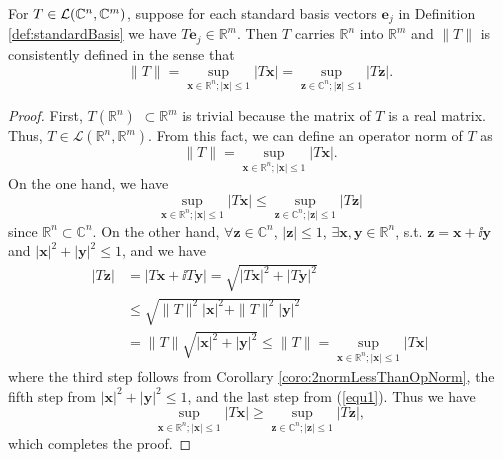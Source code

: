 \begin{lem}
  \label{lem:consistencyNestedRealInsideComplex}
  For $T\in{\cal L}(\mathbb{C}^n,\mathbb{C}^m)$, 
  suppose for each standard basis vectors $\mathbf{e}_j$
  in Definition \ref{def:standardBasis}
  we have $T \mathbf{e}_j \in \mathbb{R}^m$.
  Then $T$ carries $\mathbb{R}^n$ into $\mathbb{R}^m$
  and $\|T\|$ is consistently defined in the sense that
  \begin{equation}
    \label{eq:consistencyNestedRealInsideComplex}
    \|T\|
    = \sup_{\mathbf{x}\in \mathbb{R}^n; |\mathbf{x}|\le 1} |T \mathbf{x}|
    = \sup_{\mathbf{z}\in \mathbb{C}^n; |\mathbf{z}|\le 1} |T \mathbf{z}|.
  \end{equation}
\end{lem}
\begin{proof}
  First, $T(\mathbb{R}^n)$ $\subset \mathbb{R}^m$ is trivial because the matrix of $T$ is a real matrix.
  Thus, $T \in \mathcal{L}(\mathbb{R}^n, \mathbb{R}^m)$. From this fact, we can define an operator norm of $T$ as
  \begin{equation}\label{equ1}
    \|T\| = \underset{\mathbf{x}\in \mathbb{R}^n;|\mathbf{x}| \leq 1}{\sup}|T\mathbf{x}|.
  \end{equation}
  On the one hand, we have
  \begin{equation}\nonumber
    \underset{\mathbf{x}\in \mathbb{R}^n;|\mathbf{x}| \leq 1}{\sup}|T\mathbf{x}| \leq \underset{\mathbf{z}\in \mathbb{C}^n;|\mathbf{z}| \leq 1}{\sup}|T\mathbf{z}|
  \end{equation}
  since $\mathbb{R}^n \subset \mathbb{C}^n$. 
  On the other hand,
  $\forall \mathbf{z} \in \mathbb{C}^n$,
  $|\mathbf{z}| \leq 1$,
  $\exists \mathbf{x},\mathbf{y} \in \mathbb{R}^n$,
  s.t. $\mathbf{z} = \mathbf{x} + \ii \mathbf{y}$
  and $|\mathbf{x}|^2 + |\mathbf{y}|^2 \leq 1$, and we have
  \begin{align*}
    |T\mathbf{z}| &= |T\mathbf{x} + \ii T\mathbf{y}| =
                    \sqrt{|T\mathbf{x}|^2 + |T\mathbf{y}|^2}
    \\
                  &\le \sqrt{\|T\|^2|\mathbf{x}|^2 + \|T\|^2|\mathbf{y}|^2}
    \\
    &= \|T\|\sqrt{|\mathbf{x}|^2 + |\mathbf{y}|^2} \leq \|T\| = \underset{\mathbf{x}\in \mathbb{R}^n;|\mathbf{x}| \leq 1}{\sup}|T\mathbf{x}|  
  \end{align*}
  \noindent where the third step follows from Corollary
  \ref{coro:2normLessThanOpNorm}, 
  the fifth step from $|\mathbf{x}|^2 + |\mathbf{y}|^2 \leq 1$, and
  the last step from (\ref{equ1}). Thus we have
  \begin{displaymath}
    \underset{\mathbf{x}\in \mathbb{R}^n;
      |\mathbf{x}| \leq 1}{\sup}|T\mathbf{x}| \geq
    \underset{\mathbf{z}\in \mathbb{C}^n;
      |\mathbf{z}| \leq 1}{\sup}|T\mathbf{z}|,
  \end{displaymath}
  which completes the proof.
\end{proof}

